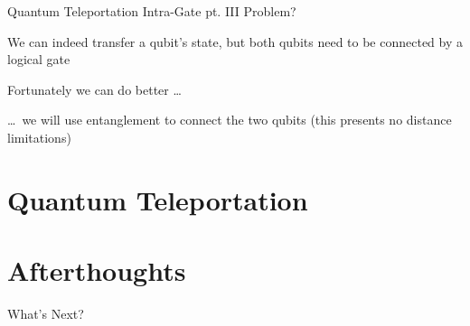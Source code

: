 \documentclass{beamer}
\begin{document}
\begin{frame}{Quantum Teleportation Intra-Gate pt. III}
     Problem?
     \pause

     We can indeed transfer a qubit's state, but both qubits
     need to be connected by a logical gate

     \pause
     Fortunately we can do better \dots

     \pause
     \dots\ we will use \alert{entanglement} to connect the 
     two qubits (this presents no distance limitations)
\end{frame}
\section{Quantum Teleportation}

\section{Afterthoughts}

\begin{frame}{What's Next?}
\end{frame}
\end{document}
